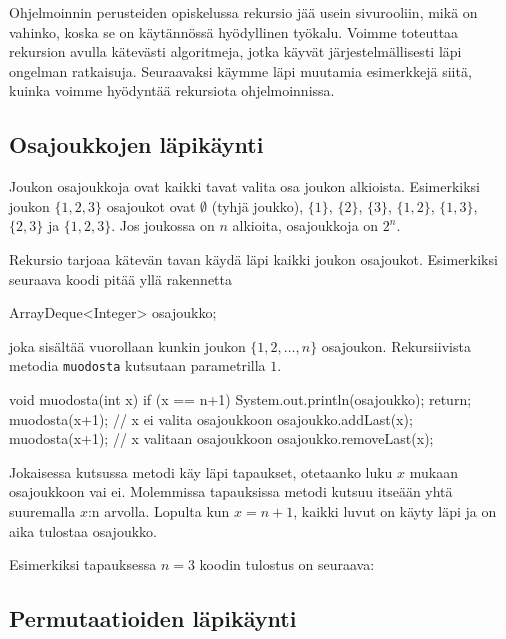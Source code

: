 Ohjelmoinnin perusteiden opiskelussa rekursio jää usein sivurooliin,
mikä on vahinko, koska se on käytännössä hyödyllinen työkalu.
Voimme toteuttaa rekursion avulla kätevästi algoritmeja,
jotka käyvät järjestelmällisesti läpi ongelman ratkaisuja.
Seuraavaksi käymme läpi muutamia esimerkkejä siitä,
kuinka voimme hyödyntää rekursiota ohjelmoinnissa.

\subsection{Osajoukkojen läpikäynti}

Joukon osajoukkoja ovat kaikki tavat valita osa joukon alkioista.
Esimerkiksi joukon $\{1,2,3\}$ osajoukot ovat
$\emptyset$ (tyhjä joukko), $\{1\}$, $\{2\}$, $\{3\}$,
$\{1,2\}$, $\{1,3\}$, $\{2,3\}$ ja $\{1,2,3\}$.
Jos joukossa on $n$ alkioita, osajoukkoja on $2^n$.

Rekursio tarjoaa kätevän tavan käydä läpi kaikki
joukon osajoukot. Esimerkiksi seuraava koodi pitää yllä
rakennetta

\begin{code}
ArrayDeque<Integer> osajoukko;
\end{code}

joka sisältää vuorollaan kunkin joukon $\{1,2,\dots,n\}$
osajoukon. Rekursiivista metodia \texttt{muodosta} kutsutaan
parametrilla $1$.

\begin{code}
void muodosta(int x) {
    if (x == n+1) {
        System.out.println(osajoukko);
        return;
    }
    muodosta(x+1); // x ei valita osajoukkoon
    osajoukko.addLast(x);
    muodosta(x+1); // x valitaan osajoukkoon
    osajoukko.removeLast(x);
}
\end{code}

Jokaisessa kutsussa metodi käy läpi tapaukset,
otetaanko luku $x$ mukaan osajoukkoon vai ei.
Molemmissa tapauksissa metodi kutsuu itseään yhtä
suuremalla $x$:n arvolla.
Lopulta kun $x=n+1$, kaikki luvut on käyty läpi
ja on aika tulostaa osajoukko.

Esimerkiksi tapauksessa $n=3$ koodin tulostus on seuraava:

\begin{code}
[]
[3]
[2]
[2, 3]
[1]
[1, 3]
[1, 2]
[1, 2, 3]
\end{code}

\subsection{Permutaatioiden läpikäynti}

